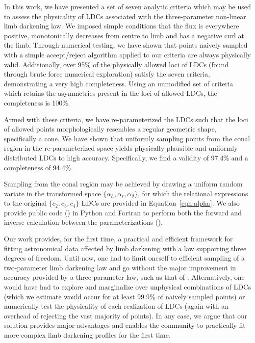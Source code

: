 
In this work, we have presented a set of seven analytic criteria which may be
used to assess the physicality of LDCs associated with the \citet{sing:2009}
three-parameter non-linear limb darkening law. We imposed simple conditions that 
the flux is everywhere positive, monotonically decreases from centre to limb and 
has a negative curl at the limb. Through numerical testing, we have shown that 
points naively sampled with a simple accept/reject algorithm applied to our 
criteria are always physically valid. Additionally, over 95\% of the physically 
allowed loci of LDCs (found through brute force numerical exploration) satisfy 
the seven criteria, demonstrating a very high completeness. Using an unmodified
set of criteria which retains the asymmetries present in the loci of allowed
LDCs, the completeness is 100\%.

Armed with these criteria, we have re-parameterized the LDCs such that the loci 
of allowed points morphologically resembles a regular geometric shape, 
specifically a cone. We have shown that uniformly sampling points from the conal
region in the re-parameterized space yields physically plausible and
uniformly distributed LDCs to high accuracy. Specifically, we find a validity
of 97.4\% and a completeness of 94.4\%. 

Sampling from the conal region may be achieved by drawing a uniform random 
variate in the transformed space $\{\alpha_h,\alpha_r,\alpha_{\theta}\}$, for 
which the relational expressions to the original $\{c_2,c_3,c_4\}$ LDCs are 
provided in Equation~\ref{eqn:alpha}. We also provide public code (\LDC) in 
Python and Fortran to perform both the forward and inverse calculation
between the parameterizations (\link).

Our work provides, for the first time, a practical and efficient framework for 
fitting astronomical data affected by limb darkening with a law supporting three
degrees of freedom. Until now, one had to limit oneself to efficient sampling 
of a two-parameter limb darkening law \citep{LD:2013} and go without the major
improvement in accuracy provided by a three-parameter law, such as that of
\citet{sing:2009}. Alternatively, one would have had to explore and marginalize
over unphysical combinations of LDCs (which we estimate would occur for at 
least 99.9\% of naively sampled points) or numerically test the physicality
of each realization of LDCs (again with an overhead of rejecting the vast
majority of points). In any case, we argue that our solution provides major
advantages and enables the community to practically fit more complex limb 
darkening profiles for the first time.

